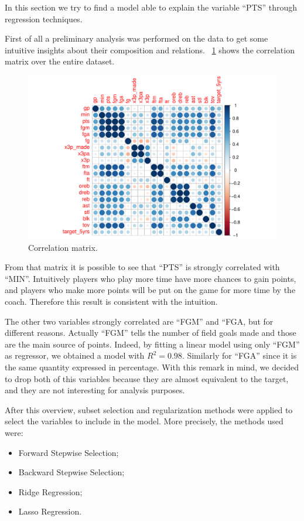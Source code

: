 In this section we try to find a model able to explain the variable ``PTS'' through regression techniques.

First of all a preliminary analysis was performed on the data to get some intuitive insights about their composition and relations.
\Fig~\ref{fig:CorrMatrix} shows the correlation matrix over the entire dataset.
\begin{figure}[h]
	\centering
	\includegraphics[width=0.5\linewidth]{ImageFiles/Regression/CorrMatrix}
	\caption{Correlation matrix.}
	\label{fig:CorrMatrix}
\end{figure}

From that matrix it is possible to see that ``PTS'' is strongly correlated with ``MIN''. Intuitively players who play more time have more chances to gain points, and players who make more points will be put on the game for more time by the coach. Therefore this result is consistent with the intuition.

The other two variables strongly correlated are ``FGM'' and ``FGA, but for different reasons. Actually ``FGM'' tells the number of field goals made and those are the main source of points. Indeed, by fitting a linear model using only ``FGM'' as regressor, we obtained a model with $R^2 = 0.98$. Similarly for ``FGA'' since it is the same quantity expressed in percentage. With this remark in mind, we decided to drop both of this variables because they are almost equivalent to the target, and they are not interesting for analysis purposes.

After this overview, subset selection and regularization methods were applied to select the variables to include in the model. More precisely, the methods used were:
\begin{itemize}
	\item Forward Stepwise Selection;
	\item Backward Stepwise Selection;
	\item Ridge Regression;
	\item Lasso Regression.
\end{itemize}
